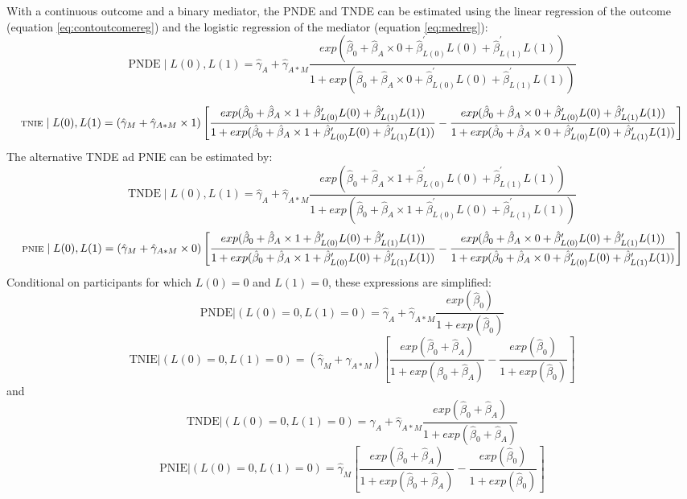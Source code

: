 \documentclass[
]{book}
\begin{document}
With a continuous outcome and a binary mediator, the PNDE and TNDE can be estimated using the linear regression of the outcome (equation \eqref{eq:contoutcomereg}) and the logistic regression of the mediator (equation \eqref{eq:medreg}):
\[\text{PNDE} \mid L(0), L(1) = \hat{\gamma}_A + \hat{\gamma}_{A \ast M} \frac{exp(\hat{\beta}_0 + \hat{\beta}_A \times 0 + \hat{\beta}_{L(0)}^\prime L(0) + \hat{\beta}_{L(1)}^\prime L(1))}{1 + exp(\hat{\beta}_0 + \hat{\beta}_A \times 0 + \hat{\beta}_{L(0)}^\prime L(0) + \hat{\beta}_{L(1)}^\prime L(1))}\]

\[\scriptsize
\text{TNIE} \mid L(0), L(1) = \left( \hat{\gamma}_M + \hat{\gamma}_{A \ast M} \times 1 \right) \left[ \frac{exp(\hat{\beta}_0 + \hat{\beta}_A \times 1 + \hat{\beta}_{L(0)}^\prime L(0) + \hat{\beta}_{L(1)}^\prime L(1))}{1 + exp(\hat{\beta}_0 + \hat{\beta}_A \times 1 + \hat{\beta}_{L(0)}^\prime L(0) + \hat{\beta}_{L(1)}^\prime L(1))} - \frac{exp(\hat{\beta}_0 + \hat{\beta}_A \times 0 + \hat{\beta}_{L(0)}^\prime L(0) + \hat{\beta}_{L(1)}^\prime L(1))}{1 + exp(\hat{\beta}_0 + \hat{\beta}_A \times 0 + \hat{\beta}_{L(0)}^\prime L(0) + \hat{\beta}_{L(1)}^\prime L(1))}\right]\]
The alternative TNDE ad PNIE can be estimated by:
\[\text{TNDE} \mid L(0), L(1) = \hat{\gamma}_A + \hat{\gamma}_{A \ast M}\frac{exp(\hat{\beta}_0 + \hat{\beta}_A \times 1 + \hat{\beta}_{L(0)}^\prime L(0) + \hat{\beta}_{L(1)}^\prime L(1))}{1 + exp(\hat{\beta}_0 + \hat{\beta}_A \times 1 + \hat{\beta}_{L(0)}^\prime L(0) + \hat{\beta}_{L(1)}^\prime L(1))}\]
\[\scriptsize \text{PNIE} \mid L(0), L(1) = \left( \hat{\gamma}_M + \hat{\gamma}_{A \ast M} \times 0 \right) \left[ \frac{exp(\hat{\beta}_0 + \hat{\beta}_A \times 1 + \hat{\beta}_{L(0)}^\prime L(0) + \hat{\beta}_{L(1)}^\prime L(1))}{1 + exp(\hat{\beta}_0 + \hat{\beta}_A \times 1 + \hat{\beta}_{L(0)}^\prime L(0) + \hat{\beta}_{L(1)}^\prime L(1))} - \frac{exp(\hat{\beta}_0 + \hat{\beta}_A \times 0 + \hat{\beta}_{L(0)}^\prime L(0) + \hat{\beta}_{L(1)}^\prime L(1))}{1 + exp(\hat{\beta}_0 + \hat{\beta}_A \times 0 + \hat{\beta}_{L(0)}^\prime L(0) + \hat{\beta}_{L(1)}^\prime L(1))}\right]\]
Conditional on participants for which \(L(0)=0\) and \(L(1)=0\), these expressions are simplified:
\[\text{PNDE} \Big| (L(0)=0, L(1)=0) = \hat{\gamma}_A + \hat{\gamma}_{A \ast M}\frac{exp(\hat{\beta}_0)}{1 + exp(\hat{\beta}_0)}\]
\[\text{TNIE} \Big| (L(0)=0, L(1)=0) = \left( \hat{\gamma}_M + \hat{\gamma}_{A \ast M} \right) \left[ \frac{exp(\hat{\beta}_0 + \hat{\beta}_A )}{1 + exp(\hat{\beta}_0 + \hat{\beta}_A )} - \frac{exp(\hat{\beta}_0 )}{1 + exp(\hat{\beta}_0)}\right]\]
and
\[\text{TNDE} \Big| (L(0)=0, L(1)=0) = \hat{\gamma}_A + \hat{\gamma}_{A \ast M}\frac{exp(\hat{\beta}_0 + \hat{\beta}_A)}{1 + exp(\hat{\beta}_0 + \hat{\beta}_A)}\]
\[\text{PNIE} \Big| (L(0)=0, L(1)=0) = \hat{\gamma}_M \left[ \frac{exp(\hat{\beta}_0 + \hat{\beta}_A )}{1 + exp(\hat{\beta}_0 + \hat{\beta}_A )} - \frac{exp(\hat{\beta}_0 )}{1 + exp(\hat{\beta}_0)}\right]\]
\end{document}
